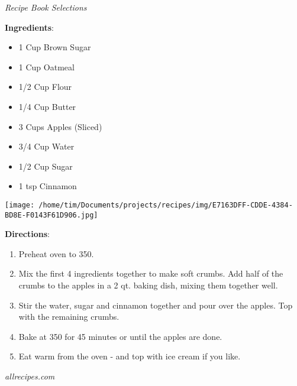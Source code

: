 \documentclass[11pt, twoside, openany]{book}
\begin{document}
 \label{apple-crumble}\hfill\textit{Recipe Book Selections}\\
\begin{minipage}[t]{0.8\linewidth}
\textbf{Ingredients}:\vspace{-3mm}
\begin{multicols}{2}
\begin{itemize}\setlength\itemsep{-1mm}
\item 1 Cup Brown Sugar
\item 1 Cup Oatmeal
\item 1/2 Cup Flour
\item 1/4 Cup Butter
\item 3 Cups Apples (Sliced)
\item 3/4 Cup Water
\item 1/2 Cup Sugar
\item 1 tsp Cinnamon
\end{itemize}
\end{multicols}
\end{minipage}
\begin{minipage}[t]{0.2\linewidth}
\centering \strut\vspace*{-\baselineskip}\newline
\texttt{[image: /home/tim/Documents/projects/recipes/img/E7163DFF-CDDE-4384-BD8E-F0143F61D906.jpg]}\\
\end{minipage}\vspace{3mm}
\textbf{Directions}:
\vspace{-3mm}\begin{enumerate}\setlength\itemsep{-1mm}
\item Preheat oven to 350.
\item Mix the first 4 ingredients together to make soft crumbs. Add half of the crumbs to the apples in a 2 qt. baking dish, mixing them together well.
\item Stir the water, sugar and cinnamon together and pour over the apples. Top with the remaining crumbs.
\item Bake at 350 for 45 minutes or until the apples are done.
\item Eat warm from the oven - and top with ice cream if you like.
\end{enumerate}
 \label{delicious-vegan-hot-chocolate}\hfill\textit{allrecipes.com}\\
\end{document}
